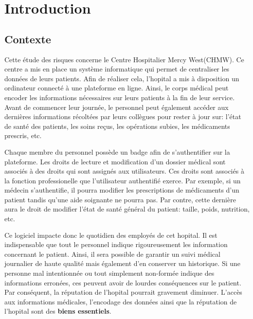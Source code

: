 \documentclass[12pt]{article}
\begin{document}
\newpage
\renewcommand{\contentsname}{Table des matières}
\tableofcontents
\newpage

\section{Introduction} 

\subsection{Contexte}

\justify
Cette étude des risques concerne le Centre Hospitalier Mercy West(CHMW). Ce centre a mis en place un système informatique qui permet de centraliser les données de leurs patients. Afin de réaliser cela, l'hopital a mis à disposition un ordinateur connecté à une plateforme en ligne. Ainsi, le corps médical peut encoder les informations nécessaires sur leurs patients à la fin de leur service. Avant de commencer leur journée, le personnel peut également accéder aux dernières informations récoltées par leurs collègues pour rester à jour sur: l'état de santé des patients, les soins reçus, les opérations subies, les médicaments prescris, etc.

\justify
Chaque membre du personnel possède un badge afin de s'authentifier sur la plateforme. Les droits de lecture et modification d'un dossier médical sont associés à des droits qui sont assignés aux utilisateurs.  Ces droits sont associés à la fonction professionelle que l'utilisateur authentifié exerce. Par exemple, si un médecin s'authentifie, il pourra modifier les prescriptions de médicaments d'un patient tandis qu'une aide soignante ne pourra pas. Par contre, cette dernière aura le droit de modifier l'état de santé général du patient: taille, poids, nutrition, etc.

\justify
Ce logiciel impacte donc le quotidien des employés de cet hopital. Il est indispensable que tout le personnel indique rigoureusement les information concernant le patient. Ainsi, il sera possible de garantir un suivi médical journalier de haute qualité mais également d'en conserver un historique. Si une personne mal intentionnée ou tout simplement non-formée indique des informations erronées, ces peuvent avoir de lourdes conséquences sur le patient. Par conséquent, la réputation de l'hopital pourrait gravement diminuer. L'accès aux informations médicales, l'encodage des données ainsi que la réputation de l'hopital sont des \textbf{biens essentiels}. 
\end{document}
